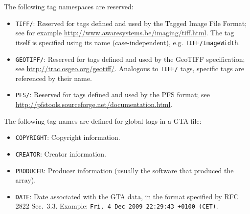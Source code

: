 \documentclass[a4paper,11pt]{article}
\newcommand{\code}[1]{\texttt{#1}}
\begin{document}
The following tag namespaces are reserved:
\begin{itemize}
\item \code{TIFF/}: Reserved for tags defined and used by the Tagged Image
File Format; see for example
\url{http://www.awaresystems.be/imaging/tiff.html}. The tag itself is
specified using its name (case-independent), e.g. \code{TIFF/ImageWidth}.
\item \code{GEOTIFF/}: Reserved for tags defined and used by the
GeoTIFF specification; see \url{http://trac.osgeo.org/geotiff/}.
Analogous to \code{TIFF/} tags, specific tags are referenced by their name.
\item \code{PFS/}: Reserved for tags defined and used by the PFS format; 
see \url{http://pfstools.sourceforge.net/documentation.html}.
\end{itemize}

The following tag names are defined for global tags in a GTA file:
\begin{itemize}
\item \code{COPYRIGHT}: Copyright information.
\item \code{CREATOR}: Creator information.
\item \code{PRODUCER}: Producer information (usually the software that 
produced the array).
\item \code{DATE}: Date associated with the GTA data, in the format specified
by RFC 2822 Sec.~3.3. Example: \code{Fri,  4 Dec 2009 22:29:43 +0100 (CET)}.
\end{itemize}
\end{document}
